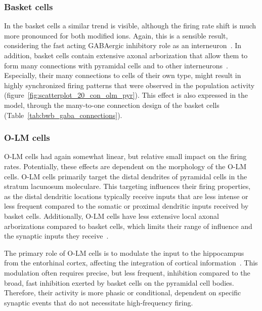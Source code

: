\subsubsection{Basket cells}
In the basket cells a similar trend is visible, although the firing rate shift is much more pronounced for both modified ions.
Again, this is a sensible result, considering the fast acting GABAergic inhibitory role as an interneuron~\parencite{wangGammaOscillationSynaptic1996}.
In addition, basket cells contain extensive axonal arborization that allow them to form many connections with pyramidal cells and
to other interneurons~\parencite{tukkerDistinctDendriticArborization2013}. Especially, their many connections to cells of their own type,
might result in highly synchronized firing patterns that were observed in the population activity (figure~\ref{fig:scatterplot_20_con_olm_pyr}).
This effect is also expressed in the model, through the many-to-one connection design of the basket cells (Table~\ref{tab:bwb_gaba_connections}).

\subsubsection{O-LM cells}
O-LM cells had again somewhat linear, but relative small impact on the firing rates.
Potentially, these effects are dependent on the morphology of the O-LM cells.
O-LM cells primarily target the distal dendrites of pyramidal cells in the stratum lacunosum moleculare.
This targeting influences their firing properties, as the distal dendritic locations typically receive inputs that are less intense or
less frequent compared to the somatic or proximal dendritic inputs received by basket cells. Additionally, O-LM cells have less extensive
local axonal arborizations compared to basket cells, which limits their range of influence and the synaptic inputs they receive~\parencite{saragaActiveDendritesSpike2003}.

The primary role of O-LM cells is to modulate the input to the hippocampus from the entorhinal cortex,
affecting the integration of cortical information~\parencite{leaoOLMInterneuronsDifferentially2012}. This modulation often requires precise,
but less frequent, inhibition compared to the broad, fast inhibition exerted by basket cells on the pyramidal cell bodies.
Therefore, their activity is more phasic or conditional, dependent on specific synaptic events that do not necessitate high-frequency firing.

